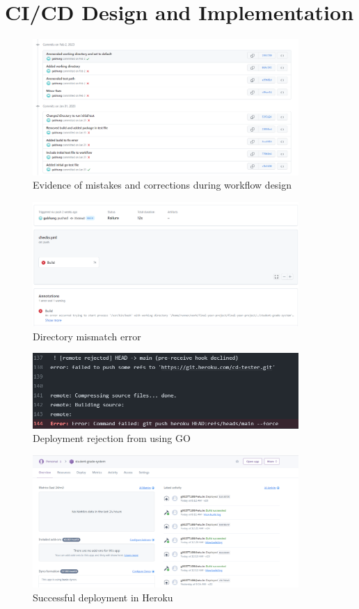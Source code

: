 \chapter{CI/CD Design and Implementation}\label{appendix:CICD}
\begin{figure}[h!]
    \centering
    \includegraphics[width=0.9\textwidth]{images/workflow-failed.png}
    \caption{Evidence of mistakes and corrections during workflow design}
    \label{image:workflow-failed}
\end{figure}

\begin{figure}[h!]
    \centering
    \includegraphics[width=0.9\textwidth]{images/build-fail-directory.png}
    \caption{Directory mismatch error}
    \label{image:build-fail-directory.png}
\end{figure}

\begin{figure}[h!]
    \centering
    \includegraphics[width=0.9\textwidth]{images/heroku-go-issue.png}
    \caption{Deployment rejection from using GO}
    \label{image:heroku-go-issue.png}
\end{figure}

\begin{figure}[h!]
    \centering
    \includegraphics[width=0.9\textwidth]{images/heroku-success.png}
    \caption{Successful deployment in Heroku}
    \label{image:heroku-success.png}
\end{figure}